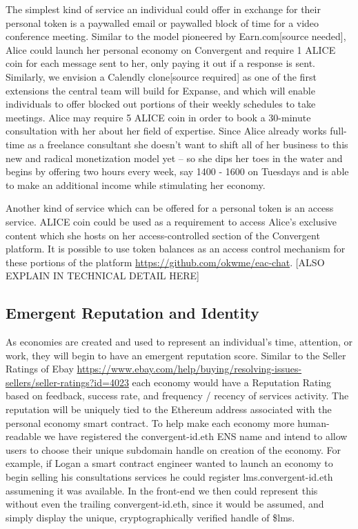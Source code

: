 \documentclass[a4paper, 10pt]{article}
\begin{document}
The simplest kind of service an individual could offer in exchange for their personal token is a paywalled email or paywalled block of time for a video conference meeting. Similar to the model pioneered by Earn.com[source needed], Alice could launch her personal economy on Convergent and require 1 ALICE coin for each message sent to her, only paying it out if a response is sent. Similarly, we envision a Calendly clone[source required] as one of the first extensions the central team will build for Expanse, and which will enable individuals to offer blocked out portions of their weekly schedules to take meetings. Alice may require 5 ALICE coin in order to book a 30-minute consultation with her about her field of expertise. Since Alice already works full-time as a freelance consultant she doesn’t want to shift all of her business to this new and radical monetization model yet -- so she dips her toes in the water and begins by offering two hours every week, say 1400 - 1600 on Tuesdays and is able to make an additional income while stimulating her economy.

Another kind of service which can be offered for a personal token is an access service. ALICE coin could be used as a requirement to access Alice’s exclusive content which she hosts on her access-controlled section of the Convergent platform. It is possible to use token balances as an access control mechanism for these portions of the platform \url{https://github.com/okwme/eac-chat}. [ALSO EXPLAIN IN TECHNICAL DETAIL HERE]

\subsection{Emergent Reputation and Identity}

As economies are created and used to represent an individual’s time, attention, or work, they will begin to have an emergent reputation score. Similar to the Seller Ratings of Ebay \url{https://www.ebay.com/help/buying/resolving-issues-sellers/seller-ratings?id=4023} each economy would have a Reputation Rating based on feedback, success rate, and frequency / recency of services activity. The reputation will be uniquely tied to the Ethereum address associated with the personal economy smart contract. To help make each economy more human-readable we have registered the convergent-id.eth ENS name and intend to allow users to choose their unique subdomain handle on creation of the economy. For example, if Logan a smart contract engineer wanted to launch an economy to begin selling his consultations services he could register lms.convergent-id.eth assumening it was available. In the front-end we then could represent this without even the trailing convergent-id.eth, since it would be assumed, and simply display the unique, cryptographically verified handle of \$lms. 
\end{document}
